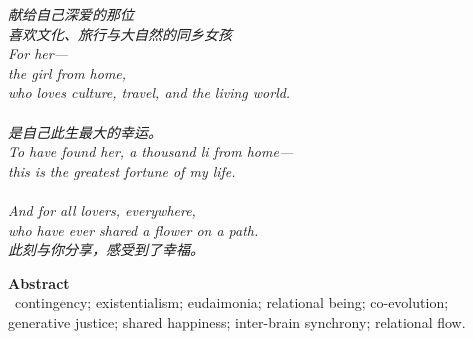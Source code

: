 \documentclass[11pt,a4paper]{article}
\begin{document}
\thispagestyle{empty}
\vspace*{4.5cm}
\begin{center}
\begin{minipage}{0.72\linewidth}
\centering\itshape\color{rose}
{\cjk 献给自己深爱的那位}\\[0.4em]
{\cjk 喜欢文化、旅行与大自然的同乡女孩}\\[0.8em]
\upshape\normalsize For her---\\[0.3em]
\itshape the girl from home,\\[0.2em]
who loves culture, travel, and the living world.\\[1.0em]
\\[0.2em]
{\cjk 是自己此生最大的幸运。}\\[0.6em]
\itshape To have found her, a thousand \emph{li} from home---\\[0.2em]
this is the greatest fortune of my life.\\[1.2em]
\\[0.3em]
\itshape And for all lovers, everywhere,\\[0.2em]
who have ever shared a flower on a path.\\[1.0em]
{\upshape\footnotesize\color{gold} {\cjk 此刻与你分享，感受到了幸福。}}
\end{minipage}
\end{center}
\newpage

\thispagestyle{empty}
\noindent\textbf{\large\color{rosedeep} Abstract}\\[0.6em]


\vspace{1.2em}
\, \textcolor{inksoft}{contingency; existentialism; eudaimonia; relational being; co-evolution; generative justice; shared happiness; inter-brain synchrony; relational flow.}
\newpage

\tableofcontents
\newpage
\end{document}
